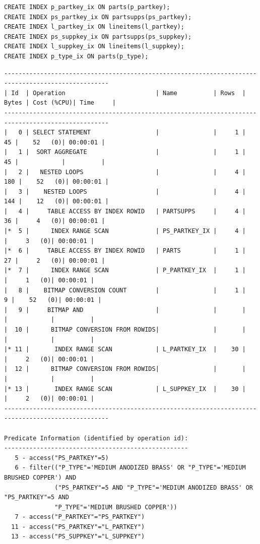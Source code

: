 \documentclass[10pt]{article}
\begin{document}
\begin{lstlisting}[style=sql]
CREATE INDEX p_partkey_ix ON parts(p_partkey);
CREATE INDEX ps_partkey_ix ON partsupps(ps_partkey);
CREATE INDEX l_partkey_ix ON lineitems(l_partkey);
CREATE INDEX ps_suppkey_ix ON partsupps(ps_suppkey);
CREATE INDEX l_suppkey_ix ON lineitems(l_suppkey);
CREATE INDEX p_type_ix ON parts(p_type);
\end{lstlisting}
\begin{lstlisting}[style=queryexecutionplanSmall]
---------------------------------------------------------------------------------------------------
| Id  | Operation                         | Name          | Rows  | Bytes | Cost (%CPU)| Time     |
---------------------------------------------------------------------------------------------------
|   0 | SELECT STATEMENT                  |               |     1 |    45 |    52   (0)| 00:00:01 |
|   1 |  SORT AGGREGATE                   |               |     1 |    45 |            |          |
|   2 |   NESTED LOOPS                    |               |     4 |   180 |    52   (0)| 00:00:01 |
|   3 |    NESTED LOOPS                   |               |     4 |   144 |    12   (0)| 00:00:01 |
|   4 |     TABLE ACCESS BY INDEX ROWID   | PARTSUPPS     |     4 |    36 |     4   (0)| 00:00:01 |
|*  5 |      INDEX RANGE SCAN             | PS_PARTKEY_IX |     4 |       |     3   (0)| 00:00:01 |
|*  6 |     TABLE ACCESS BY INDEX ROWID   | PARTS         |     1 |    27 |     2   (0)| 00:00:01 |
|*  7 |      INDEX RANGE SCAN             | P_PARTKEY_IX  |     1 |       |     1   (0)| 00:00:01 |
|   8 |    BITMAP CONVERSION COUNT        |               |     1 |     9 |    52   (0)| 00:00:01 |
|   9 |     BITMAP AND                    |               |       |       |            |          |
|  10 |      BITMAP CONVERSION FROM ROWIDS|               |       |       |            |          |
|* 11 |       INDEX RANGE SCAN            | L_PARTKEY_IX  |    30 |       |     2   (0)| 00:00:01 |
|  12 |      BITMAP CONVERSION FROM ROWIDS|               |       |       |            |          |
|* 13 |       INDEX RANGE SCAN            | L_SUPPKEY_IX  |    30 |       |     2   (0)| 00:00:01 |
---------------------------------------------------------------------------------------------------
 
Predicate Information (identified by operation id):
---------------------------------------------------
   5 - access("PS_PARTKEY"=5)
   6 - filter(("P_TYPE"='MEDIUM ANODIZED BRASS' OR "P_TYPE"='MEDIUM BRUSHED COPPER') AND 
              ("PS_PARTKEY"=5 AND "P_TYPE"='MEDIUM ANODIZED BRASS' OR "PS_PARTKEY"=5 AND 
              "P_TYPE"='MEDIUM BRUSHED COPPER'))
   7 - access("P_PARTKEY"="PS_PARTKEY")
  11 - access("PS_PARTKEY"="L_PARTKEY")
  13 - access("PS_SUPPKEY"="L_SUPPKEY")
\end{lstlisting}
\end{document}
